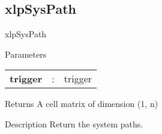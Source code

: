 \subsection{xlpSysPath}

\begin{xlpfunctitle}{xlpSysPath}
\begin{xlpfunc}{Parameters}
\begin{tabular}{p{3.5cm}cl}
\textbf{trigger}& : & trigger \\
\end{tabular}
\end{xlpfunc}


\begin{xlpfunc}{Returns}
A cell matrix of dimension (1, n)
\end{xlpfunc}

\begin{xlpfunc}{Description}
Return the system paths.
\end{xlpfunc}
\end{xlpfunctitle}